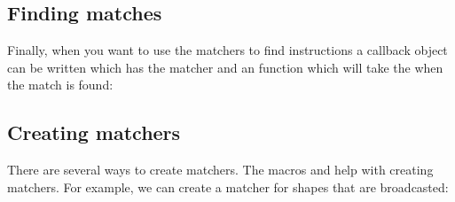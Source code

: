 \documentclass[letterpaper,10pt,english]{sphinxmanual}
\begin{document}
\subsection{Finding matches}
\label{\detokenize{dev/matchers:finding-matches}}
\sphinxAtStartPar
Finally, when you want to use the matchers to find instructions a callback object can be written which has the matcher and an  function which will take the  when the match is found:

\begin{sphinxVerbatim}[commandchars=\\\{\}]


\end{sphinxVerbatim}


\subsection{Creating matchers}
\label{\detokenize{dev/matchers:creating-matchers}}
\sphinxAtStartPar
There are several ways to create matchers. The macros  and  help with creating matchers. For example, we can create a matcher for shapes that are broadcasted:

\begin{sphinxVerbatim}[commandchars=\\\{\}]
\end{sphinxVerbatim}
\end{document}
